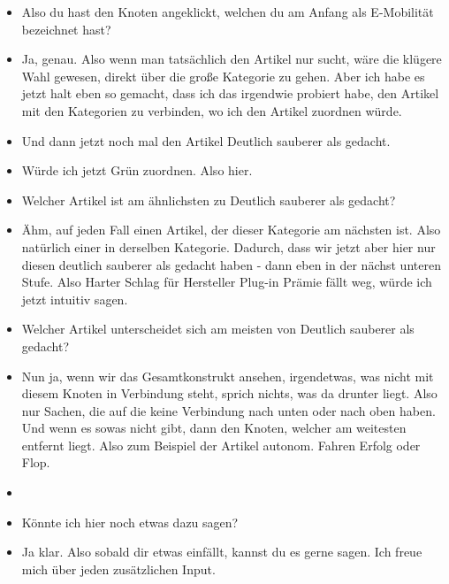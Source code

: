 {\begin{itemize}[]
                  Nö, eben nicht.
                  Unlucky.
                  Also ich wollte es jetzt so spezifisch wie möglich machen.
                  Ich könnte natürlich auch hier lang, also den Knoten anklicken und dann schauen, wo der Artikel ist.
            \item {} Also du hast den Knoten angeklickt, welchen du am Anfang als E-Mobilität bezeichnet hast?
            \item {} Ja, genau.
                  Also wenn man tatsächlich den Artikel nur sucht, wäre die klügere Wahl gewesen, direkt über die große Kategorie zu gehen.
                  Aber ich habe es jetzt halt eben so gemacht, dass ich das irgendwie probiert habe, den Artikel mit den Kategorien zu verbinden, wo ich den Artikel zuordnen würde.
            \item {} Und dann jetzt noch mal den Artikel \flqq Deutlich sauberer als gedacht\frqq{}.
            \item {} Würde ich jetzt Grün zuordnen. Also hier.
            \item {} Welcher Artikel ist am ähnlichsten zu \flqq Deutlich sauberer als gedacht\frqq{}?
            \item {} Ähm, auf jeden Fall einen Artikel, der dieser Kategorie am nächsten ist.
                  Also natürlich einer in derselben Kategorie.
                  Dadurch, dass wir jetzt aber hier nur diesen deutlich sauberer als gedacht haben - dann eben in der nächst unteren Stufe.
                  Also \flqq Harter Schlag für Hersteller Plug-in Prämie fällt weg\frqq{}, würde ich jetzt intuitiv sagen.
            \item {} Welcher Artikel unterscheidet sich am meisten von \flqq Deutlich sauberer als gedacht\frqq{}?
            \item {} Nun ja, wenn wir das Gesamtkonstrukt ansehen, irgendetwas, was nicht mit diesem Knoten in Verbindung steht, sprich nichts, was da drunter liegt.
                  Also nur Sachen, die auf die keine Verbindung nach unten oder nach oben haben.
                  Und wenn es sowas nicht gibt, dann den Knoten, welcher am weitesten entfernt liegt.
                  Also zum Beispiel der Artikel \flqq autonom. Fahren Erfolg oder Flop\frqq{}.
            \item {}
            \item {} Könnte ich hier noch etwas dazu sagen?
            \item {} Ja klar. Also sobald dir etwas einfällt, kannst du es gerne sagen. Ich freue mich über jeden zusätzlichen Input.

\end{itemize}}
